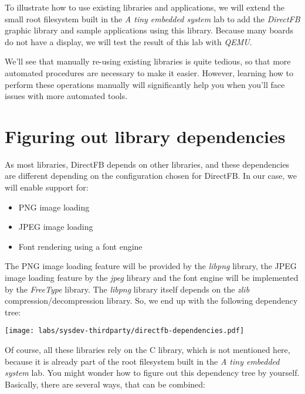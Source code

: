 
To illustrate how to use existing libraries and applications, we will
extend the small root filesystem built in the {\em A tiny embedded
  system} lab to add the {\em DirectFB} graphic library and sample
applications using this library. Because many boards do not have a
display, we will test the result of this lab with {\em QEMU}.

We'll see that manually re-using existing libraries is quite tedious,
so that more automated procedures are necessary to make it
easier. However, learning how to perform these operations manually
will significantly help you when you'll face issues with more
automated tools.

\section{Figuring out library dependencies}

As most libraries, DirectFB depends on other libraries, and these
dependencies are different depending on the configuration chosen for
DirectFB. In our case, we will enable support for:

\begin{itemize}
\item PNG image loading
\item JPEG image loading
\item Font rendering using a font engine
\end{itemize}

The PNG image loading feature will be provided by the {\em libpng}
library, the JPEG image loading feature by the {\em jpeg} library and
the font engine will be implemented by the {\em FreeType} library. The
{\em libpng} library itself depends on the {\em zlib}
compression/decompression library. So, we end up with the following
dependency tree:

\begin{center}
\texttt{[image: labs/sysdev-thirdparty/directfb-dependencies.pdf]}
\end{center}

Of course, all these libraries rely on the C library, which is not
mentioned here, because it is already part of the root filesystem
built in the {\em A tiny embedded system} lab. You might wonder how to
figure out this dependency tree by yourself. Basically, there are
several ways, that can be combined:

